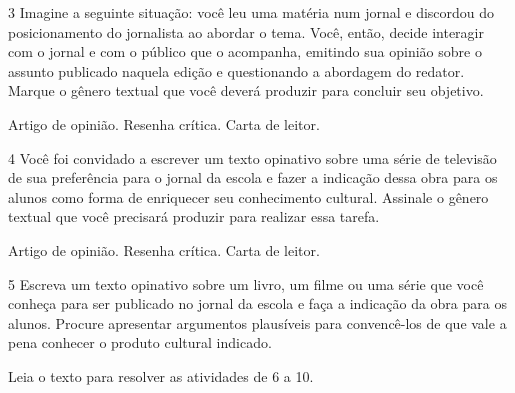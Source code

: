 \num{3} Imagine a seguinte situação: você leu uma matéria num jornal e discordou do posicionamento do
jornalista ao abordar o tema. Você, então, decide interagir com o jornal
e com o público que o acompanha, emitindo sua opinião sobre o assunto
publicado naquela edição e questionando a abordagem do
redator. Marque o gênero textual que você deverá produzir para concluir
seu objetivo.

\begin{boxlist}
 Artigo de opinião.
 Resenha crítica.
 Carta de leitor.
\end{boxlist}

\num{4} Você foi convidado a escrever um texto opinativo sobre uma série
de televisão de sua preferência para o jornal da escola e fazer a
indicação dessa obra para os alunos como forma de enriquecer seu
conhecimento cultural. Assinale o gênero textual que você precisará
produzir para realizar essa tarefa.

\begin{boxlist}
 Artigo de opinião.
 Resenha crítica.
 Carta de leitor.
\end{boxlist}

\num{5} Escreva um texto opinativo sobre um livro, um filme ou uma série
que você conheça para ser publicado no jornal da escola e faça a
indicação da obra para os alunos. Procure apresentar argumentos
plausíveis para convencê-los de que vale a pena conhecer o produto cultural indicado.


Leia o texto para resolver as atividades de 6 a 10.

